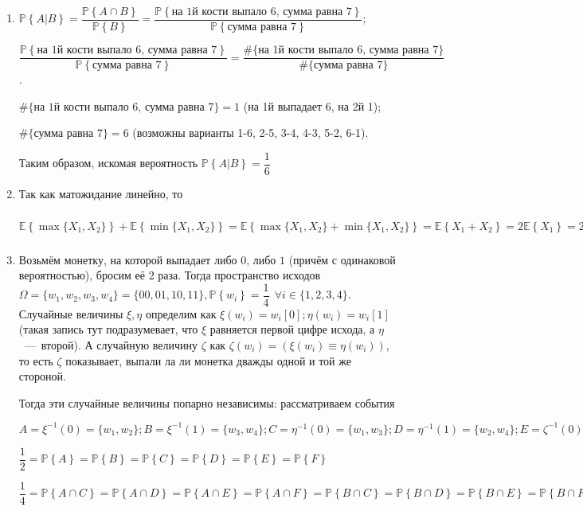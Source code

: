 \documentclass[a4paper,12pt]{article}
\newcommand{\prob}[1]{\mathbb{P}\left\{#1\right\}}
\newcommand{\expected}[1]{\mathbb{E}\left\{#1\right\}}
\begin{document}
\begin{solution}
	\begin{enumerate}
		\item $\prob{A|B} = \dfrac{\prob{A \cap B}}{\prob{B}} = \dfrac{\prob{\text{на 1й кости выпало 6, сумма равна 7}}}{\prob{\text{сумма равна 7}}}$;
		
		$\dfrac{\prob{\text{на 1й кости выпало 6, сумма равна 7}}}{\prob{\text{сумма равна 7}}} = \dfrac{\#\{\text{на 1й кости выпало 6, сумма равна 7}\}}{\#\{\text{сумма равна 7}\}}$. 
		
		$\#\{\text{на 1й кости выпало 6, сумма равна 7}\} = 1$ (на 1й выпадает 6, на 2й 1);
		
		$\#\{\text{сумма равна 7}\} = 6$ (возможны варианты 1-6, 2-5, 3-4, 4-3, 5-2, 6-1).
		
		Таким образом, искомая вероятность $\prob{A|B} = \dfrac{1}{6}$
		
		\item Так как матожидание линейно, то 
		
		$\expected{\max\{X_1,X_2\}} + \expected{\min\{X_1,X_2\}} = \expected{\max\{X_1, X_2\} + \min\{X_1, X_2\}} = \expected{X_1 + X_2} = 2 \expected{X_1} = 2 \cdot \left(\dfrac{1}{6} \cdot (1 + 2 + 3 + 4 + 5 + 6)\right) = 2 \cdot 3.5 = 7$
		
		\item Возьмём монетку, на которой выпадает либо $0$, либо $1$ (причём с одинаковой вероятностью), бросим её 2 раза. Тогда пространство исходов $\Omega = \{w_1, w_2, w_3, w_4\} = \{00, 01, 10, 11\}, \prob{w_i} = \dfrac{1}{4} \ \ \forall i \in \{1, 2, 3, 4\}$. Случайные величины $\xi, \eta$ определим как $\xi(w_i) = w_i[0]; \eta(w_i) = w_i[1]$ (такая запись тут подразумевает, что $\xi$ равняется первой цифре исхода, а $\eta$~---~второй). А случайную величину $\zeta$ как $\zeta(w_i) = (\xi(w_i) \equiv \eta(w_i))$, то есть $\zeta$ показывает, выпали ла ли монетка дважды одной и той же стороной.
		
		Тогда эти случайные величины попарно независимы: рассматриваем события
		
		$A = \xi^{-1}(0) = \{w_1, w_2\}; B = \xi^{-1}(1) = \{w_3, w_4\}; C = \eta^{-1}(0) = \{w_1, w_3\}; D = \eta^{-1}(1) = \{w_2, w_4\}; E = \zeta^{-1}(0) = \{w_2, w_3\}; F = \zeta^{-1}(1) = \{w_1, w_4\}$
		
		$\dfrac{1}{2} = \prob{A} = \prob{B} = \prob{C} = \prob{D} = \prob{E} = \prob{F}$
		
		$\dfrac{1}{4} = \prob{A \cap C} = \prob{A \cap D} = \prob{A \cap E} = \prob{A \cap F} = \prob{B \cap C} = \prob{B \cap D} = \prob{B \cap E} = \prob{B \cap F} = \prob{C \cap E} = \prob{C \cap F} = \prob{D \cap E} = \prob{D \cap F}$
		

\end{enumerate}
\end{solution}
\end{document}
